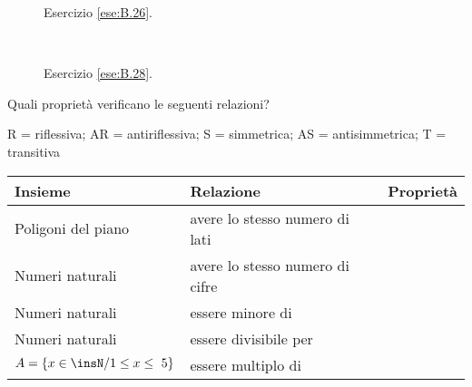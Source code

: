 \begin{inaccessibleblock}
 \begin{figure}[t]
\begin{minipage}[b]{.45\textwidth}
 \centering
 
 \caption{Esercizio \ref{ese:B.26}.}\label{fig:B.17}
\end{minipage}\
\begin{minipage}[b]{.45\textwidth}
 \centering
 
 \caption{Esercizio \ref{ese:B.28}.}\label{fig:B.18}
\end{minipage}
\end{figure}
\end{inaccessibleblock}


\begin{esercizio}
\label{ese:B.29}
Quali proprietà verificano le seguenti relazioni?
\begin{center}
R = riflessiva; AR = antiriflessiva; S = simmetrica; AS = antisimmetrica; 
T = transitiva
\end{center}
\begin{center}
\begin{tabular}{llc}
\toprule
Insieme & Relazione & Proprietà\\
\midrule
Poligoni del piano & avere lo stesso numero di lati & 
 \boxR\quad\boxAR\quad\boxS\quad\boxAS\quad\boxT\\
Numeri naturali & avere lo stesso numero di cifre &
 \boxR\quad\boxAR\quad\boxS\quad\boxAS\quad\boxT\\
Numeri naturali & essere minore di &
 \boxR\quad\boxAR\quad\boxS\quad\boxAS\quad\boxT\\
Numeri naturali & essere divisibile per &
 \boxR\quad\boxAR\quad\boxS\quad\boxAS\quad\boxT\\
$A = \{ x \in \insN / 1 \leq x \leq~5 \}$ & essere multiplo di &
 \boxR\quad\boxAR\quad\boxS\quad\boxAS\quad\boxT\\
\bottomrule
\end{tabular}
\end{center}
\end{esercizio}



